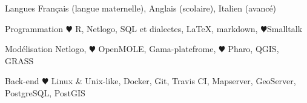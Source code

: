 

\begin{cvskills}

  \cvskill
    {Langues} %
    {Français (langue maternelle), Anglais (scolaire), Italien (avancé) } %

  \cvskill
    {Programmation} %
    {{\color{red} $\varheartsuit$} R, Netlogo, SQL et dialectes, \LaTeX, markdown, {\color{red} $\varheartsuit$}Smalltalk} %

  \cvskill
    {Modélisation} %
    {Netlogo, {\color{red} $\varheartsuit$} OpenMOLE, Gama-platefrome,
  {\color{red} $\varheartsuit$} Pharo, QGIS, GRASS} %

  \cvskill
    {Back-end} %
    {{\color{red} $\varheartsuit$} Linux \& Unix-like, Docker, Git, Travis CI, Mapserver, GeoServer, PostgreSQL, PostGIS} %

\end{cvskills}
